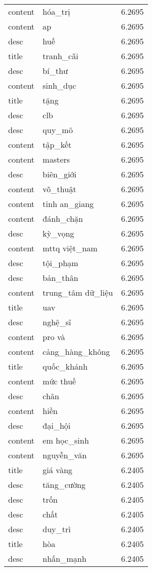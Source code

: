 \documentclass{article}
\begin{document}
\begin{tabular}{lll}
content & hóa\_trị & 6.2695\\
content & ap & 6.2695\\
desc & huế & 6.2695\\
title & tranh\_cãi & 6.2695\\
desc & bí\_thư & 6.2695\\
content & sinh\_dục & 6.2695\\
title & tặng & 6.2695\\
desc & clb & 6.2695\\
desc & quy\_mô & 6.2695\\
content & tập\_kết & 6.2695\\
content & masters & 6.2695\\
desc & biên\_giới & 6.2695\\
content & võ\_thuật & 6.2695\\
content & tỉnh an\_giang & 6.2695\\
content & đánh\_chặn & 6.2695\\
desc & kỳ\_vọng & 6.2695\\
content & mttq việt\_nam & 6.2695\\
desc & tội\_phạm & 6.2695\\
desc & bản\_thân & 6.2695\\
content & trung\_tâm dữ\_liệu & 6.2695\\
title & uav & 6.2695\\
desc & nghệ\_sĩ & 6.2695\\
content & pro và & 6.2695\\
content & cảng\_hàng\_không & 6.2695\\
title & quốc\_khánh & 6.2695\\
content & mức thuế & 6.2695\\
desc & chân & 6.2695\\
content & hiền & 6.2695\\
desc & đại\_hội & 6.2695\\
content & em học\_sinh & 6.2695\\
content & nguyễn\_văn & 6.2695\\
title & giá vàng & 6.2405\\
desc & tăng\_cường & 6.2405\\
desc & trốn & 6.2405\\
desc & chất & 6.2405\\
desc & duy\_trì & 6.2405\\
title & hòa & 6.2405\\
desc & nhấn\_mạnh & 6.2405\\

\end{tabular}
\end{document}
